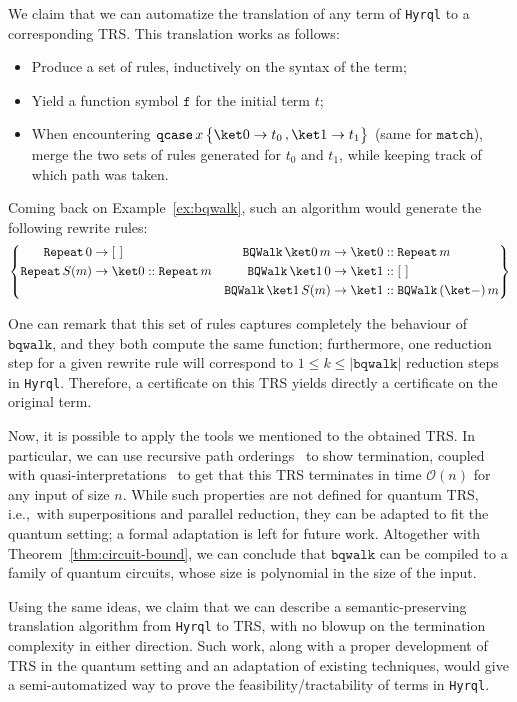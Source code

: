 \documentclass[10pt,a4paper]{article}
\newcommand{\nil}{[~]}
\newcommand{\textqcase}{\ensuremath{\mathtt{qcase}}}
\newcommand{\textmatch}{\ensuremath{\mathtt{match}}}
\newcommand{\zket}{\ket 0}
\newcommand{\oket}{\ket 1}
\newcommand{\qcasebase}[2]{
  \textqcase\,#1\left\{\! \begin{aligned} #2 \end{aligned}\right\}
}
\newcommand{\qcase}[3]{
  \qcasebase {#1} {\zket \to #2\,, \oket \to #3}
}
\newcommand{\qcasedefault}[1]{\ensuremath{\qcase{#1}{t_0}{t_1}}}
\newcommand{\size}[1]{|#1|}
\newcommand{\hyrql}{{{\tt{Hyrql}}}}
\newcommand{\mcal}{\mathcal}
\newcommand{\mtf}{\mathtt f}
\begin{document}
We claim that we can automatize the translation of any term of \hyrql{} to a
corresponding TRS. This translation works as follows:

\begin{itemize}
  \item Produce a set of rules, inductively on the syntax of the term;
  \item Yield a function symbol $\mtf$ for the initial term $t$;
  \item When encountering $\qcasedefault x$ (same for \textmatch{}), merge the 
    two sets of rules generated for $t_0$ and $t_1$, while keeping track of
    which path was taken.
\end{itemize}

Coming back on Example~\ref{ex:bqwalk}, such an algorithm would generate the
following rewrite rules:
\[
  \left\{
    \begin{aligned}
      \mathtt{Repeat}\,0 &\to \nil   &\mathtt{BQWalk}\,\zket\,m &\to \zket ::
      \mathtt{Repeat}\,m \\
      \mathtt{Repeat}\,S(m) &\to \zket:: \mathtt{Repeat}\,m  &
      \mathtt{BQWalk}\,\oket\,0 &\to \oket :: \nil \\
      & &     \mathtt{BQWalk}\,\oket\,S(m) &\to \oket ::
      \mathtt{BQWalk}\,(\ket -)\,m
    \end{aligned}
  \right\}
\]

One can remark that this set of rules captures completely
the behaviour of $\mathtt{bqwalk}$, and they both compute the same function;
furthermore, one reduction step for a given rewrite rule will correspond to
$1 \leq k \leq \size{\mathtt{bqwalk}}$ reduction steps in \hyrql{}.
Therefore, a certificate on this TRS yields directly a certificate on the
original term. 

Now, it is possible to apply the tools we mentioned to the obtained TRS. In
particular, we can use recursive path orderings~\cite{Der82} to show
termination, coupled with quasi-interpretations~\cite{BMM11} to get that this
TRS terminates in time $\mcal O(n)$ for any input of size $n$. While such
properties are not defined for quantum TRS, i.e.,\ with superpositions and
parallel reduction, they can be adapted to fit the quantum setting; a formal
adaptation is left for future work. Altogether with
Theorem~\ref{thm:circuit-bound}, we can conclude that
$\mathtt{bqwalk}$ can be compiled to a family of quantum circuits, whose size
is polynomial in the size of the input.

Using the same ideas, we claim that we can describe a semantic-preserving
translation algorithm from \hyrql{} to TRS, with no blowup on the termination
complexity in either direction. Such work, along with a proper development of
TRS in the quantum setting and an adaptation of existing techniques, would give
a semi-automatized way to prove the feasibility/tractability of terms in
\hyrql{}.
\end{document}
